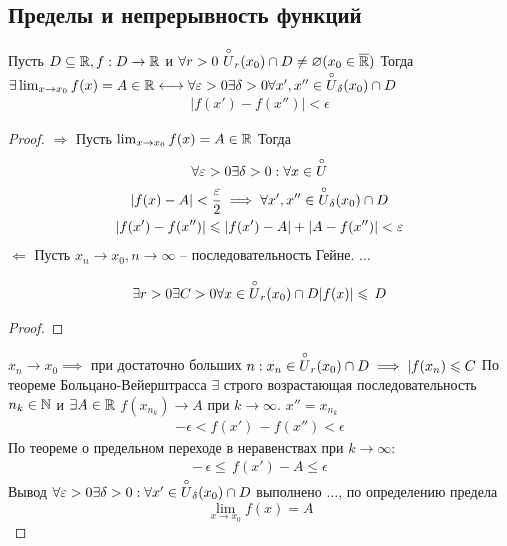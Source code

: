 \subsection{Пределы и непрерывность функций}
\begin{theorem}
	Пусть $ D \subseteq \mathbb{R}, f:D\to \mathbb{R} $ и $ \forall r > 0\ \overset{\circ}{U}_r(x_0) \cap D \neq  \varnothing(x_0 \in \overline{ \mathbb{R}}) $
	Тогда $ \exists \lim_{x\to x_0}f(x) = A \in \mathbb{R} \longleftrightarrow \forall  \varepsilon > 0 \exists \delta > 0 \forall x', x'' \in \overset{\circ}{U}_\delta(x_0)\cap D $
	 \begin{gather}
		|f(x') - f(x'')| < \epsilon
	\end{gather}
\end{theorem}
\begin{proof}
	 $ \Longrightarrow $
	Пусть $ \lim_{x \to  x_0}f(x) = A \in  \mathbb{R} $ Тогда \begin{gather}
		\forall \varepsilon > 0 \exists \delta > 0: \forall x \in \overset{\circ}{U} \\
		|f(x) - A| < \dfrac{\varepsilon}{2} \implies \forall x', x'' \in \overset{\circ}{U}_\delta (x_0)\cap D \\
		|f(x') - f(x'')| \leqslant |f(x') - A| + |A - f(x'')| < \varepsilon
	\end{gather}
	 $ \Longleftarrow $ Пусть $ x_n \to x_0, n \to \infty $ -- последовательность Гейне.
	 $ \dots  $ \begin{lemma}
		
	 
	 \begin{gather}
		\exists r > 0 \exists C > 0 \forall x \in \overset{\circ}{U}_r(x_0)\cap D |f(x)| \leqslant\, D
	\end{gather}
\end{lemma}
	\begin{proof}
		
	\end{proof}
	 $ x_n \to  x_0 \implies$ при достаточно больших $ n: x_n \in \overset{\circ}{U}_r(x_0) \cap D \implies  |f(x_n) \leqslant  C$
	 По теореме Больцано-Вейерштрасса $ \exists  $ строго возрастающая последовательность $ n_k \in \mathbb{N} $ и $ \exists  A \in \mathbb{R} $ $ f(x_{n_k}) \to A $ при $ k \to \infty $.
	 $ x'' = x_{n_k} $
	 \begin{gather}
		 - \epsilon < f(x')\, - f(x'') < \epsilon
	\end{gather}
	По теореме о предельном переходе в неравенствах при $ k \to  \infty $: \begin{gather}
		 -\, \epsilon \leq\, f(x') - A \leq \epsilon
	\end{gather}
	Вывод $ \forall \varepsilon > 0 \exists \delta > 0: \forall x' \in \overset{\circ}{U}_\delta(x_0) \cap D $ выполнено $ \dots  $, по определению предела \[ \lim_{x \to  x_0}f(x) = A \] 
\end{proof}
